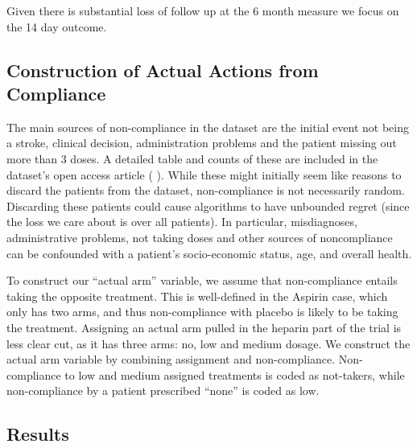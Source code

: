 Given there is substantial loss of follow up at the 6 month measure we focus on the 14 day outcome.


\subsection{Construction of Actual Actions from Compliance}
The main sources of non-compliance in the dataset are the initial event not being a stroke, clinical decision, administration problems and the patient missing out more than 3 doses. A detailed table and counts of these are included in the dataset's open access article ( \cite{ist:11}). 
While these might initially seem like reasons to discard the patients from the dataset, non-compliance is not necessarily random. Discarding these patients could cause algorithms to have unbounded regret (since the loss we care about is over all patients). In particular, misdiagnoses, administrative problems, not taking doses and other sources of noncompliance can be confounded with a patient's socio-economic status, age, and overall health. 

To construct our ``actual arm'' variable, we assume that non-compliance entails taking the opposite treatment.
This is well-defined in the Aspirin case, which only has two arms, and thus non-compliance with placebo is likely to be taking the treatment.
Assigning an actual arm pulled in the heparin part of the trial is less clear cut, as it has three arms: no, low and medium dosage. We construct the actual arm variable by combining assignment and non-compliance. Non-compliance to low and medium assigned treatments is coded as not-takers, while non-compliance by a patient prescribed ``none'' is coded as low.



\subsection{Results}


